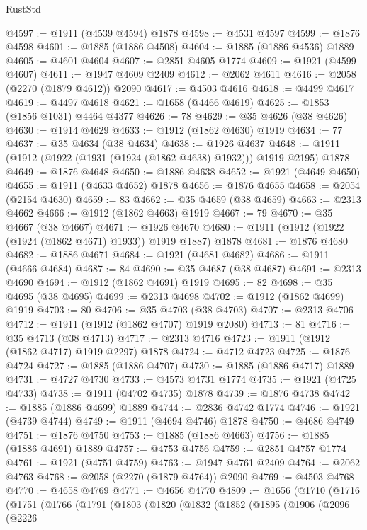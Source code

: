 \begin{lexlean}{RustStd}
\begin{coremodule}
{\begin{coremodule}
{{{{{{{{{{{{{{{{{{{{{{{{{{{{{@4597 := @1911 (@4539 @4594) @1878
@4598 := @4531 @4597
@4599 := @1876 @4598
@4601 := @1885 (@1886 @4508)
@4604 := @1885 (@1886 @4536) @1889
@4605 := @4601 @4604
@4607 := @2851 @4605 @1774
@4609 := @1921 (@4599 @4607)
@4611 := @1947 @4609 @2409
@4612 := @2062 @4611
@4616 := @2058 (@2270 (@1879 @4612)) @2090
@4617 := @4503 @4616
@4618 := @4499 @4617
@4619 := @4497 @4618
@4621 := @1658 (@4466 @4619)
@4625 := @1853 (@1856 @1031) @4464 @4377
@4626 := 78
@4629 := @35 @4626 (@38 @4626)
@4630 := @1914 @4629
@4633 := @1912 (@1862 @4630) @1919
@4634 := 77
@4637 := @35 @4634 (@38 @4634)
@4638 := @1926 @4637
@4648 := @1911 (@1912 (@1922 (@1931 (@1924 (@1862 @4638) @1932))) @1919 @2195) @1878
@4649 := @1876 @4648
@4650 := @1886 @4638
@4652 := @1921 (@4649 @4650)
@4655 := @1911 (@4633 @4652) @1878
@4656 := @1876 @4655
@4658 := @2054 (@2154 @4630)
@4659 := 83
@4662 := @35 @4659 (@38 @4659)
@4663 := @2313 @4662
@4666 := @1912 (@1862 @4663) @1919
@4667 := 79
@4670 := @35 @4667 (@38 @4667)
@4671 := @1926 @4670
@4680 := @1911 (@1912 (@1922 (@1924 (@1862 @4671) @1933)) @1919 @1887) @1878
@4681 := @1876 @4680
@4682 := @1886 @4671
@4684 := @1921 (@4681 @4682)
@4686 := @1911 (@4666 @4684)
@4687 := 84
@4690 := @35 @4687 (@38 @4687)
@4691 := @2313 @4690
@4694 := @1912 (@1862 @4691) @1919
@4695 := 82
@4698 := @35 @4695 (@38 @4695)
@4699 := @2313 @4698
@4702 := @1912 (@1862 @4699) @1919
@4703 := 80
@4706 := @35 @4703 (@38 @4703)
@4707 := @2313 @4706
@4712 := @1911 (@1912 (@1862 @4707) @1919 @2080)
@4713 := 81
@4716 := @35 @4713 (@38 @4713)
@4717 := @2313 @4716
@4723 := @1911 (@1912 (@1862 @4717) @1919 @2297) @1878
@4724 := @4712 @4723
@4725 := @1876 @4724
@4727 := @1885 (@1886 @4707)
@4730 := @1885 (@1886 @4717) @1889
@4731 := @4727 @4730
@4733 := @4573 @4731 @1774
@4735 := @1921 (@4725 @4733)
@4738 := @1911 (@4702 @4735) @1878
@4739 := @1876 @4738
@4742 := @1885 (@1886 @4699) @1889
@4744 := @2836 @4742 @1774
@4746 := @1921 (@4739 @4744)
@4749 := @1911 (@4694 @4746) @1878
@4750 := @4686 @4749
@4751 := @1876 @4750
@4753 := @1885 (@1886 @4663)
@4756 := @1885 (@1886 @4691) @1889
@4757 := @4753 @4756
@4759 := @2851 @4757 @1774
@4761 := @1921 (@4751 @4759)
@4763 := @1947 @4761 @2409
@4764 := @2062 @4763
@4768 := @2058 (@2270 (@1879 @4764)) @2090
@4769 := @4503 @4768
@4770 := @4658 @4769
@4771 := @4656 @4770
@4809 := @1656
    (@1710
      (@1716
        (@1751
          (@1766
            (@1791
              (@1803
                (@1820
                  (@1832
                    (@1852
                      (@1895
                        (@1906
                          (@2096
                            (@2226
}}}}}}}}}}}}}}}}}}}}}}}}}}}}}
\end{coremodule}}
\end{coremodule}
\end{lexlean}
